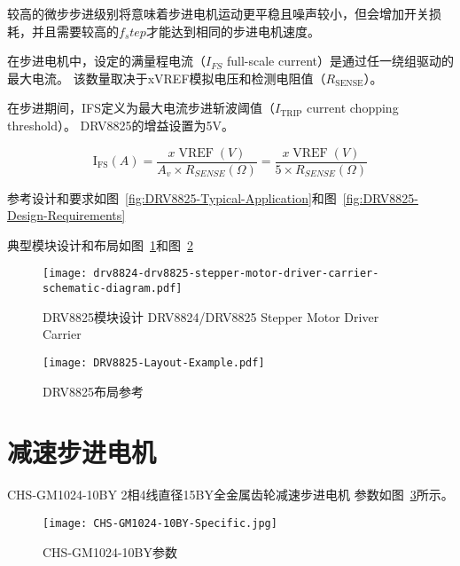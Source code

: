 较高的微步步进级别将意味着步进电机运动更平稳且噪声较小，但会增加开关损耗，并且需要较高的$f_step$才能达到相同的步进电机速度。

在步进电机中，设定的满量程电流（$I_{FS}$ full-scale current）是通过任一绕组驱动的最大电流。 该数量取决于xVREF模拟电压和检测电阻值（$R_{\text {SENSE}}$）。 

在步进期间，IFS定义为最大电流步进斩波阈值（$I_{\text {TRIP}}$ current chopping threshold）。 DRV8825的增益设置为5V。

\begin{equation}
    \operatorname{I_{FS}}(A)=\frac{x \operatorname{VREF}(V)}{A_{v} \times R_{S E N S E}(\Omega)}=\frac{x \operatorname{VREF}(V)}{5 \times R_{S E N S E}(\Omega)}
\end{equation}

参考设计和要求如图~\ref{fig:DRV8825-Typical-Application}和图~\ref{fig:DRV8825-Design-Requirements}

典型模块设计和布局如图~\ref{fig:DRV8825-stepper-motor-driver-carrier-schematic-diagram}和图~\ref{fig:DRV8825-Layout-Example}

\begin{figure}[htbp]
    \centering
    \texttt{[image: drv8824-drv8825-stepper-motor-driver-carrier-schematic-diagram.pdf]}
    \caption{DRV8825模块设计 DRV8824/DRV8825 Stepper Motor Driver Carrier}
    \label{fig:DRV8825-stepper-motor-driver-carrier-schematic-diagram}
\end{figure}

\begin{figure}[htbp]
    \centering
    \texttt{[image: DRV8825-Layout-Example.pdf]}
    \caption{DRV8825布局参考}
    \label{fig:DRV8825-Layout-Example}
\end{figure}


\section{减速步进电机}

CHS-GM1024-10BY 2相4线直径15BY全金属齿轮减速步进电机 参数如图~\ref{fig:CHS-GM1024-10BY-Specific}所示。

\begin{figure}[htbp]
    \centering
    \texttt{[image: CHS-GM1024-10BY-Specific.jpg]}
    \caption{CHS-GM1024-10BY参数}
    \label{fig:CHS-GM1024-10BY-Specific}
\end{figure}

